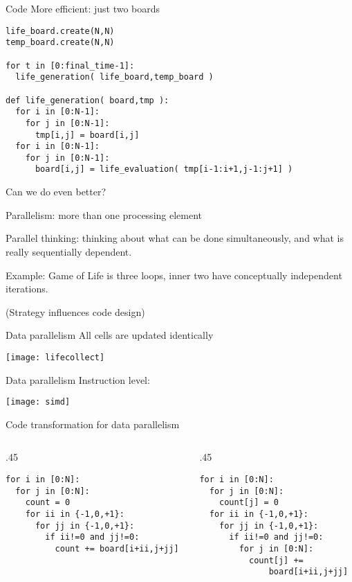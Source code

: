 \begin{frame}[fragile]{Code}
More efficient: just two boards
\begin{verbatim}
life_board.create(N,N)
temp_board.create(N,N)

for t in [0:final_time-1]:
  life_generation( life_board,temp_board )

def life_generation( board,tmp ):
  for i in [0:N-1]:
    for j in [0:N-1]:
      tmp[i,j] = board[i,j]
  for i in [0:N-1]:
    for j in [0:N-1]:
      board[i,j] = life_evaluation( tmp[i-1:i+1,j-1:j+1] )
\end{verbatim}
Can we do even better?
\end{frame}

\begin{frame}
  Parallelism: more than one processing element

  Parallel thinking: thinking about what can be done simultaneously,
  and what is really sequentially dependent.

  Example: Game of Life is three loops, inner two have conceptually
  independent iterations.

  (Strategy influences code design)
\end{frame}

\begin{frame}{Data parallelism}
  All cells are updated identically

  \texttt{[image: lifecollect]}
\end{frame}

\begin{frame}{Data parallelism}
  Instruction level:

  \texttt{[image: simd]}
\end{frame}

\begin{frame}[fragile]{Code transformation for data parallelism}
\small
\begin{columns}
\begin{column}{.45\hsize}
\begin{verbatim}
for i in [0:N]:
  for j in [0:N]:
    count = 0
    for ii in {-1,0,+1}:
      for jj in {-1,0,+1}:
        if ii!=0 and jj!=0:
          count += board[i+ii,j+jj]
\end{verbatim}
\end{column}
\begin{column}{.45\hsize}
\begin{verbatim}
for i in [0:N]:
  for j in [0:N]:
    count[j] = 0
  for ii in {-1,0,+1}:
    for jj in {-1,0,+1}:
      if ii!=0 and jj!=0:
        for j in [0:N]:
          count[j] += 
              board[i+ii,j+jj]
\end{verbatim}
\end{column}
\end{columns}

\end{frame}


